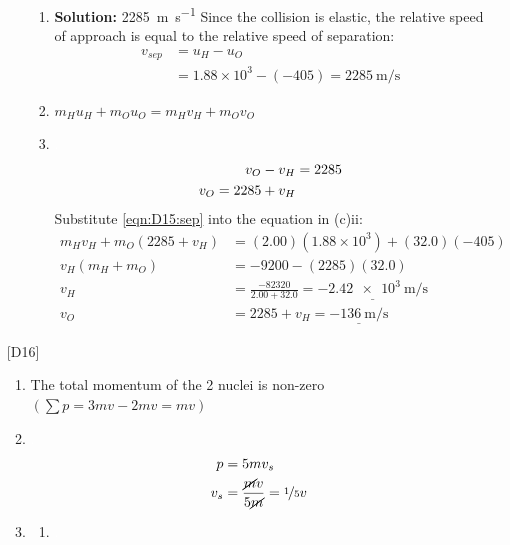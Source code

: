 \documentclass[11pt]{article}
\newcommand{\solution}[1]{\textbf{Solution: } #1 \hspace{5mm}}
\begin{document}
\begin{enumerate}
\begin{enumerate}
			\begin{enumerate}
				\item \solution{\SI{2285}{\meter\per\second}} Since the collision is elastic, the relative speed of approach is equal to the relative speed of separation:
				\begin{align*}
					v_{sep} &= u_H - u_O \\
					&= 1.88\times 10^3 - (-405) = \SI{2285}{\meter\per\second}
				\end{align*}
				\item $m_Hu_H + m_Ou_O = m_Hv_H + m_Ov_O$
				\item \textcolor{white}{.}
				\vspace{-0.7cm}
				\begin{align}
					v_O - v_H &= 2285 \notag\\
					v_O = 2285 + v_H \label{eqn:D15:sep}
				\end{align}
				Substitute \eqref{eqn:D15:sep} into the equation in (c)ii:
				\begin{align*}
					m_Hv_H+m_O(2285 + v_H) &= (2.00)\left(1.88\times 10^3\right) + (32.0)(-405)\\
					v_H (m_H+m_O) &=-9200 - (2285)(32.0) \\
					v_H &= \frac{-82320}{2.00+32.0} = \underline{\SI{-2.42e3}{\meter\per\second}} \\
					v_O &= 2285 + v_H = \underline{\SI{-136}{\meter\per\second}}
				\end{align*}
			\end{enumerate}
		\end{enumerate}
		\pagebreak
		\item[{[D16]}]
		\begin{enumerate}
			\item The total momentum of the 2 nuclei is non-zero $\left(\sum p = 3mv - 2mv = mv\right)$
			\item \textcolor{white}{.}
			\vspace{-0.7cm}
			\begin{align*}
				p &= 5mv_s \\
				v_s &= \frac{\cancel{m}v}{5\cancel{m}} = \nicefrac{1}{5} v
			\end{align*}
			\item 
			\begin{enumerate}
				\item \textcolor{white}{.}
				\begin{figure}[ht!]
					\vspace{-0.7cm}
					\centering

\end{figure}
\end{enumerate}
\end{enumerate}
\end{enumerate}
\end{document}
